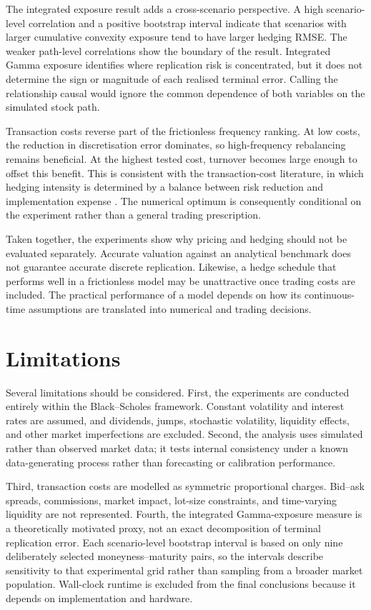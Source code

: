 \documentclass[11pt,a4paper]{article}
\begin{document}
The integrated exposure result adds a cross-scenario perspective. A high scenario-level correlation and a positive bootstrap interval indicate that scenarios with larger cumulative convexity exposure tend to have larger hedging RMSE. The weaker path-level correlations show the boundary of the result. Integrated Gamma exposure identifies where replication risk is concentrated, but it does not determine the sign or magnitude of each realised terminal error. Calling the relationship causal would ignore the common dependence of both variables on the simulated stock path.

Transaction costs reverse part of the frictionless frequency ranking. At low costs, the reduction in discretisation error dominates, so high-frequency rebalancing remains beneficial. At the highest tested cost, turnover becomes large enough to offset this benefit. This is consistent with the transaction-cost literature, in which hedging intensity is determined by a balance between risk reduction and implementation expense \citep{leland1985,toft1996,grannanswindle1996,whalleywilmott1997}. The numerical optimum is consequently conditional on the experiment rather than a general trading prescription.

Taken together, the experiments show why pricing and hedging should not be evaluated separately. Accurate valuation against an analytical benchmark does not guarantee accurate discrete replication. Likewise, a hedge schedule that performs well in a frictionless model may be unattractive once trading costs are included. The practical performance of a model depends on how its continuous-time assumptions are translated into numerical and trading decisions.

\section{Limitations}

Several limitations should be considered. First, the experiments are conducted entirely within the Black--Scholes framework. Constant volatility and interest rates are assumed, and dividends, jumps, stochastic volatility, liquidity effects, and other market imperfections are excluded. Second, the analysis uses simulated rather than observed market data; it tests internal consistency under a known data-generating process rather than forecasting or calibration performance.

Third, transaction costs are modelled as symmetric proportional charges. Bid--ask spreads, commissions, market impact, lot-size constraints, and time-varying liquidity are not represented. Fourth, the integrated Gamma-exposure measure is a theoretically motivated proxy, not an exact decomposition of terminal replication error. Each scenario-level bootstrap interval is based on only nine deliberately selected moneyness--maturity pairs, so the intervals describe sensitivity to that experimental grid rather than sampling from a broader market population. Wall-clock runtime is excluded from the final conclusions because it depends on implementation and hardware.
\end{document}
